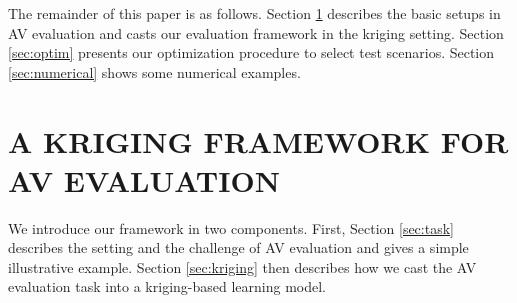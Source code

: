 \documentclass{wscpaperproc}
\theoremstyle{wsc}
\begin{document}
The remainder of this paper is as follows.  Section \ref{sec:example} describes the basic setups in AV evaluation and casts our evaluation framework in the kriging setting. Section \ref{sec:optim} presents our optimization procedure to select test scenarios. Section \ref{sec:numerical} shows some numerical examples. 







\section{A KRIGING FRAMEWORK FOR AV EVALUATION} \label{sec:example}
We introduce our framework in two components. First, Section \ref{sec:task} describes the setting and the challenge of AV evaluation and gives a simple illustrative example. Section \ref{sec:kriging} then describes how we cast the AV evaluation task into a kriging-based learning model.
\end{document}
